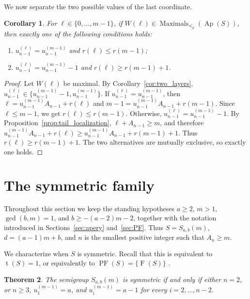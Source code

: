 \documentclass[12pt,a4paper]{amsart}
\newtheorem{theorem}{Theorem}[section]
\newtheorem{corollary}[theorem]{Corollary}
\theoremstyle{definition}
\begin{document}
We now separate the two possible values of the last coordinate.

\begin{corollary}\label{cor:two_bands}
For $\ell\in\{0,\ldots,m-1\}$, if $W(\ell) \in \operatorname{Maximals}_{\preceq_S}(\operatorname{Ap}(S))$, then exactly one of the following
conditions holds:
\begin{enumerate}
\item[\rm(I)] $u_{n-1}^{(\ell)}=u_{n-1}^{(m-1)}$ and
$r(\ell)\le r(m-1)$;
\item[\rm(II)] $u_{n-1}^{(\ell)}=u_{n-1}^{(m-1)}-1$ and
$r(\ell)\ge r(m-1)+1$.
\end{enumerate}
\end{corollary}

\begin{proof}
Let $W(\ell)$ be maximal. By Corollary~\ref{cor:two_layers},
$u_{n-1}^{(\ell)}\in
\{u_{n-1}^{(m-1)}-1,u_{n-1}^{(m-1)}\}$. If
$u_{n-1}^{(\ell)}=u_{n-1}^{(m-1)}$, then
$\ell=u_{n-1}^{(m-1)}A_{n-1}+r(\ell)$ and
$m-1=u_{n-1}^{(m-1)}A_{n-1}+r(m-1)$. Since $\ell\le m-1$, we get
$r(\ell)\le r(m-1)$. Otherwise,
$u_{n-1}^{(\ell)}=u_{n-1}^{(m-1)}-1$. By
Proposition~\ref{prop:tail_localization}, $\ell+A_{n-1}\ge m$, and
therefore
$u_{n-1}^{(m-1)}A_{n-1}+r(\ell)\ge
u_{n-1}^{(m-1)}A_{n-1}+r(m-1)+1$. Thus
$r(\ell)\ge r(m-1)+1$. The two alternatives are mutually exclusive, so
exactly one holds.
\end{proof}

\section{The symmetric family}\label{sec:symmetric_family}

Throughout this section we keep the standing hypotheses
$a\ge 2$, $m>1$, $\gcd(b,m)=1$, and $b\ge -(a-2)m-2$, together with the
notation introduced in Sections~\ref{sec:apery} and~\ref{sec:PF}. Thus
$S=S_{a,b}(m)$, $d=(a-1)m+b$, and $n$ is the smallest positive integer
such that $A_n\ge m$.

We characterize when $S$ is symmetric. Recall that this is equivalent to
$\operatorname{t}(S)=1$, or equivalently to
$\operatorname{PF}(S)=\{\operatorname{F}(S)\}$
\cite[Corollary~4.11]{libro}.

\begin{theorem}\label{th:type-one}
The semigroup $S_{a,b}(m)$ is symmetric if and only if either $n=2$, or $n\ge 3$, $u_1^{(m-1)}=a$, and $u_i^{(m-1)}=a-1$ for every $i=2,\ldots,n-2$.
\end{theorem}
\end{document}
